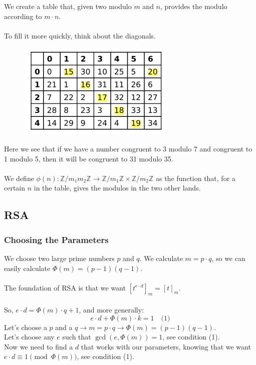 \documentclass{article}
\begin{document}
We create a table that, given two modulo \( m \) and \( n \), provides the modulo according to \( m \cdot n \).\\\\
To fill it more quickly, think about the diagonals.

\begin{figure}[h]
    \centering
    \includegraphics[width=0.5\linewidth]{crt.png}
    \label{fig:enter-label}
\end{figure}

Here we see that if we have a number congruent to 3 modulo 7 and congruent to 1 modulo 5, then it will be congruent to 31 modulo 35.\\\\
We define \(\phi(n) : \mathbb{Z}/m_1m_2\mathbb{Z} \rightarrow \mathbb{Z}/m_1\mathbb{Z} \times \mathbb{Z}/m_2\mathbb{Z}\) as the function that, for a certain \( n \) in the table, gives the modulos in the two other lands.

\newpage

\subsection{RSA}

\subsubsection{Choosing the Parameters}

We choose two large prime numbers \( p \) and \( q \).
We calculate \( m = p \cdot q \), so we can easily calculate \(\Phi(m) = (p-1)(q-1)\).\\\\
The foundation of RSA is that we want \([t^{e \cdot d}]_m = [t]_m\).\\\\
So, \( e \cdot d = \Phi(m) \cdot q + 1 \), and more generally:
\[
e \cdot d + \Phi(m) \cdot k = 1 \quad \text{(1)}
\]
Let's choose a \( p \) and a \( q \rightarrow m = p \cdot q \rightarrow \Phi(m) = (p-1)(q-1)\).\\
Let's choose any \( e \) such that \( \gcd(e, \Phi(m)) = 1 \), see condition (1).\\
Now we need to find a \( d \) that works with our parameters, knowing that we want \( e \cdot d \equiv 1 \pmod{\Phi(m)} \), see condition (1).
\end{document}

